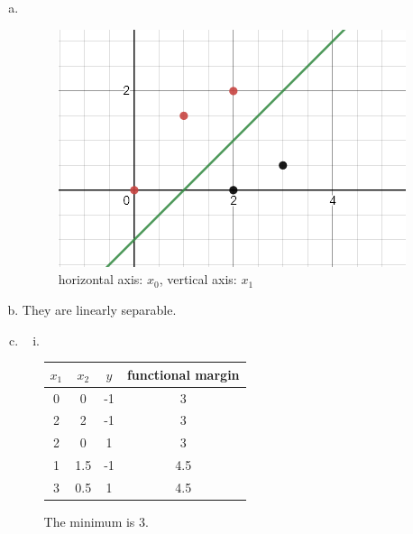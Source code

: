 \documentclass[12pt]{article}
\title{} %
\author{Liheng Cao} %
\date{\today} %
\begin{document}
\maketitle

\section{}
\begin{enumerate}[(a)]
	\item \,\begin{figure}[H]
		\centering
		\includegraphics{images/1a.png}
		\caption{horizontal axis: $x_0$, vertical axis: $ x_1 $}
		\label{fig:1:a}
	\end{figure}

	\item They are linearly separable.
	
	\item
		\begin{enumerate}[i.]
			\item\,
			\begin{table}[H]
				\centering
					\begin{tabular}{|c|c|c|c|}
					\hline 
					$x_1$ & $ x_2 $ & $ y $ & functional margin\\\hline
					\hline
					0 & 0 & -1 & 3\\\hline
					2 & 2 & -1 & 3\\\hline
					2 & 0 & 1 & 3\\\hline
					1 & 1.5 & -1 & 4.5\\\hline
					3 & 0.5 & 1 & 4.5\\\hline				
				\end{tabular}
			\end{table}
			The minimum is 3. 
		

\end{enumerate}
\end{enumerate}
\end{document}
